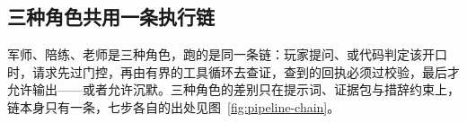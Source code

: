 %
%
%
%
\subsection*{三种角色共用一条执行链}

军师、陪练、老师是三种角色，跑的是同一条链：玩家提问、或代码判定该开口时，请求先过门控，再由有界的工具循环去查证，查到的回执必须过校验，最后才允许输出——或者允许沉默。三种角色的差别只在提示词、证据包与措辞约束上，链本身只有一条，七步各自的出处见图~\ref{fig:pipeline-chain}。

